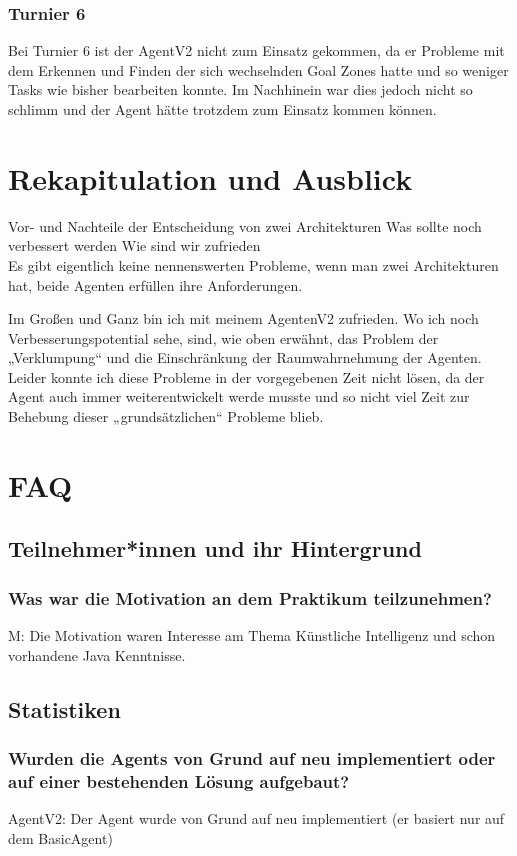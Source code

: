 \documentclass[runningheads]{llncs}
\begin{document}
\subsubsection{Turnier 6\\}
Bei Turnier 6 ist der AgentV2 nicht zum Einsatz gekommen, da er Probleme mit dem Erkennen und Finden der sich wechselnden Goal Zones hatte und so weniger Tasks wie bisher bearbeiten konnte. Im Nachhinein war dies jedoch nicht so schlimm und der Agent hätte trotzdem zum Einsatz kommen können. 

\section{Rekapitulation und Ausblick}
Vor- und Nachteile der Entscheidung von zwei Architekturen
Was sollte noch verbessert werden
Wie sind wir zufrieden\\

Es gibt eigentlich keine nennenswerten Probleme, wenn man zwei Architekturen hat, beide Agenten erfüllen ihre Anforderungen. 

Im Großen und Ganz bin ich mit meinem AgentenV2 zufrieden. Wo ich noch Verbesserungspotential sehe, sind, wie oben erwähnt, das Problem der „Verklumpung“ und die Einschränkung der Raumwahrnehmung der Agenten. Leider konnte ich diese Probleme in der vorgegebenen Zeit nicht lösen, da der Agent auch immer weiterentwickelt werde musste und so nicht viel Zeit zur Behebung dieser „grundsätzlichen“ Probleme blieb.

\section{FAQ}
\subsection{Teilnehmer*innen und ihr Hintergrund}
\subsubsection{Was war die Motivation an dem Praktikum teilzunehmen?\\}
M: Die Motivation waren Interesse am Thema Künstliche Intelligenz und schon vorhandene Java Kenntnisse.
\subsection{Statistiken}
\subsubsection{Wurden die Agents von Grund auf neu implementiert oder auf einer bestehenden Lösung aufgebaut?\\}
AgentV2: Der Agent wurde von Grund auf neu implementiert (er basiert nur auf dem BasicAgent)
\end{document}
